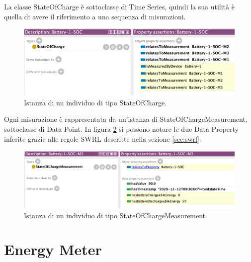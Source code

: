 La classe StateOfCharge è sottoclasse di Time Series, quindi la sua utilità è quella di avere il riferimento a una sequenza di misurazioni.
\begin{figure}[H]
    \centering
    \includegraphics[width=12cm]{images/individual-batterysoc.png}
    \caption{Istanza di un individuo di tipo StateOfCharge.}
    \label{fig:individual-batterysoc}
\end{figure}
Ogni misurazione è rappresentata da un'istanza di StateOfChargeMeasurement, sottoclasse di Data Point.
In figura \ref{fig:individual_batterym3} si possono notare le due Data Property inferite grazie alle regole SWRL descritte nella sezione \ref{sec:swrl}.
\begin{figure}[H]
    \centering
    \includegraphics[width=12cm]{images/individual-batterym3.png}
    \caption{Istanza di un individuo di tipo StateOfChargeMeasurement.}
    \label{fig:individual_batterym3}
\end{figure}

\section{Energy Meter}


